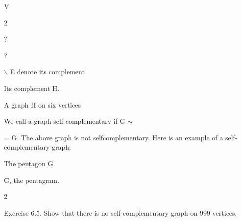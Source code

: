 \documentclass[a4paper,portrait,12pt]{article}
\begin{document}
\begin{flushleft}
V
\end{flushleft}


2





?





?


\begin{flushleft}
\ensuremath{\backslash} E denote its complement
\end{flushleft}





\begin{flushleft}
Its complement H̄.
\end{flushleft}





\begin{flushleft}
A graph H on six vertices
\end{flushleft}





\begin{flushleft}
We call a graph self-complementary if G $\sim$
\end{flushleft}


\begin{flushleft}
= Ḡ. The above graph is not selfcomplementary. Here is an example of a self-complementary graph:
\end{flushleft}





\begin{flushleft}
The pentagon G.
\end{flushleft}





\begin{flushleft}
Ḡ, the pentagram.
\end{flushleft}





2





\begin{flushleft}
\newpage
Exercise 6.5. Show that there is no self-complementary graph on 999 vertices.
\end{flushleft}
\end{document}
